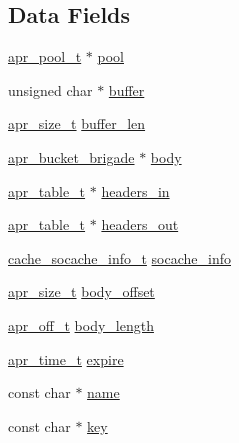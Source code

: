 \subsection*{Data Fields}
\begin{DoxyCompactItemize}
\item 
\hyperlink{structapr__pool__t}{apr\+\_\+pool\+\_\+t} $\ast$ \hyperlink{structcache__socache__object__t_a54506960b69814e05c9e4a0c452a98c3}{pool}
\item 
unsigned char $\ast$ \hyperlink{structcache__socache__object__t_a2e37584e7b6f1762dacf84c67d9ef8e6}{buffer}
\item 
\hyperlink{group__apr__platform_gaaa72b2253f6f3032cefea5712a27540e}{apr\+\_\+size\+\_\+t} \hyperlink{structcache__socache__object__t_ac18489243fd845d28cad0a95691454e2}{buffer\+\_\+len}
\item 
\hyperlink{structapr__bucket__brigade}{apr\+\_\+bucket\+\_\+brigade} $\ast$ \hyperlink{structcache__socache__object__t_aee86ee1d2e74aa5148a2974e47372fb9}{body}
\item 
\hyperlink{structapr__table__t}{apr\+\_\+table\+\_\+t} $\ast$ \hyperlink{structcache__socache__object__t_a26d2d8f7103e74445bc85c667b9b3a3d}{headers\+\_\+in}
\item 
\hyperlink{structapr__table__t}{apr\+\_\+table\+\_\+t} $\ast$ \hyperlink{structcache__socache__object__t_adcd67d38211bdb31d43c15f0a48aeb45}{headers\+\_\+out}
\item 
\hyperlink{structcache__socache__info__t}{cache\+\_\+socache\+\_\+info\+\_\+t} \hyperlink{structcache__socache__object__t_a49f6b0486a38146645f859bcea663d2a}{socache\+\_\+info}
\item 
\hyperlink{group__apr__platform_gaaa72b2253f6f3032cefea5712a27540e}{apr\+\_\+size\+\_\+t} \hyperlink{structcache__socache__object__t_a43a17d82ee6523c528ecded5efed8380}{body\+\_\+offset}
\item 
\hyperlink{group__apr__platform_ga6938af9075cec15c88299109381aa984}{apr\+\_\+off\+\_\+t} \hyperlink{structcache__socache__object__t_a852782d58867580097528882614051bc}{body\+\_\+length}
\item 
\hyperlink{group__apr__time_gadb4bde16055748190eae190c55aa02bb}{apr\+\_\+time\+\_\+t} \hyperlink{structcache__socache__object__t_a6e2f870fa3da390836fac2528ccc6645}{expire}
\item 
const char $\ast$ \hyperlink{structcache__socache__object__t_a022bf718069b8cbd5102df0af3ce53a3}{name}
\item 
const char $\ast$ \hyperlink{structcache__socache__object__t_aa40dc34236b269986c73d36080eb3c1a}{key}

\end{DoxyCompactItemize}
